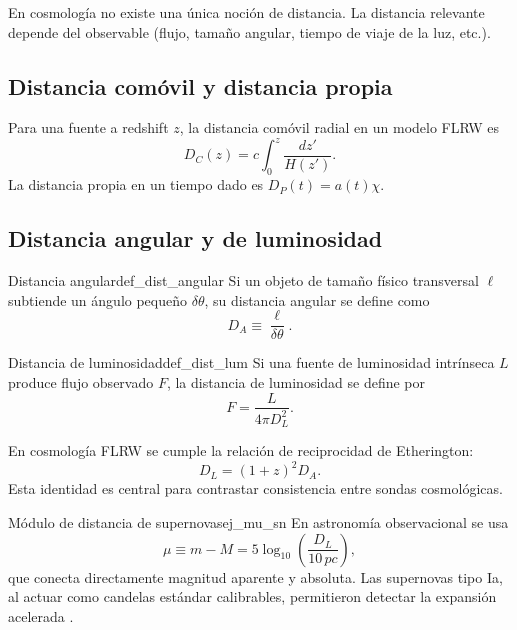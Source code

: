 En cosmología no existe una única noción de distancia. La distancia relevante depende del observable (flujo, tamaño angular, tiempo de viaje de la luz, etc.).

\subsection{Distancia comóvil y distancia propia}

Para una fuente a redshift $z$, la distancia comóvil radial en un modelo FLRW es
\begin{equation}
  D_C(z) = c\int_0^z \frac{dz'}{H(z')}.
  \label{eq:dist_comovil}
\end{equation}
La distancia propia en un tiempo dado es $D_P(t)=a(t)\chi$.

\subsection{Distancia angular y de luminosidad}

\begin{definicion}{Distancia angular}{def_dist_angular}
Si un objeto de tamaño físico transversal $\ell$ subtiende un ángulo pequeño $\delta\theta$, su distancia angular se define como
\begin{equation}
  D_A \equiv \frac{\ell}{\delta\theta}.
\end{equation}
\end{definicion}

\begin{definicion}{Distancia de luminosidad}{def_dist_lum}
Si una fuente de luminosidad intrínseca $L$ produce flujo observado $F$, la distancia de luminosidad se define por
\begin{equation}
  F = \frac{L}{4\pi D_L^2}.
\end{equation}
\end{definicion}

En cosmología FLRW se cumple la relación de reciprocidad de Etherington:
\begin{equation}
  \boxed{D_L = (1+z)^2 D_A.}
  \label{eq:etherington}
\end{equation}
Esta identidad es central para contrastar consistencia entre sondas cosmológicas.

\begin{ejemplo}{Módulo de distancia de supernovas}{ej_mu_sn}
En astronomía observacional se usa
\begin{equation}
  \mu \equiv m-M = 5\log_{10}\!\left(\frac{D_L}{10\,\si{pc}}\right),
\end{equation}
que conecta directamente magnitud aparente y absoluta. Las supernovas tipo Ia, al actuar como candelas estándar calibrables, permitieron detectar la expansión acelerada \cite{Riess1998, Perlmutter1999}.
\end{ejemplo}

